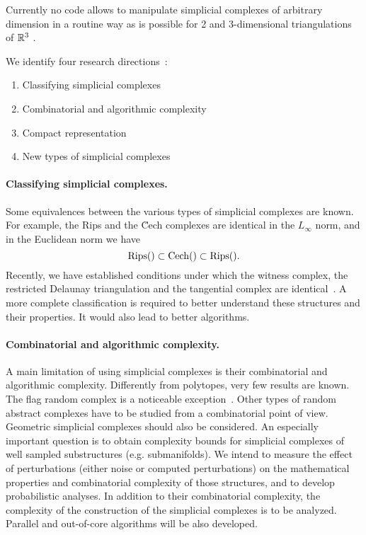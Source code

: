  Currently no code allows to manipulate simplicial complexes of arbitrary dimension in a routine way as is possible for 2 and 3-dimensional triangulations of $\mathbb R ^3$ \cite{springerflo,DBLP:journals/tog/PaoluzziBCF93,svy-crm-99}. 

We identify four research directions~:
\begin{enumerate}
\item Classifying simplicial complexes
\item Combinatorial and algorithmic complexity 
\item Compact representation
\item New types of simplicial complexes
\end{enumerate}

\paragraph{Classifying simplicial complexes.}
Some equivalences between the various types of simplicial complexes are known. For example,
the Rips and the \u{C}ech complexes are identical in the $L_\infty$ norm, and in the Euclidean norm we have 
\[ {\rm Rips} () \subset {\rm {C}ech} () \subset {\rm Rips} () .\]
Recently, we have established conditions under which the witness complex, the restricted Delaunay triangulation and the tangential complex are identical~\cite{}. A more complete classification is required to better understand these structures and their properties. 
It would also lead to  better algorithms.



\paragraph{Combinatorial and algorithmic complexity.}
A main limitation of using simplicial complexes is their combinatorial and algorithmic complexity.  Differently from polytopes, very few results are known. The flag random complex is a noticeable exception~\cite{}. Other types of random abstract complexes have to be studied from a combinatorial point of view. Geometric simplicial complexes should also be considered.  An especially important question is to obtain complexity bounds for simplicial complexes of well sampled substructures (e.g. submanifolds).  We intend to measure the effect of perturbations (either noise or computed perturbations) on the mathematical properties and combinatorial complexity of those structures, and to develop probabilistic analyses. In addition to their combinatorial complexity, the complexity of the construction of the simplicial complexes is to be analyzed.  Parallel and out-of-core algorithms will be also developed.


